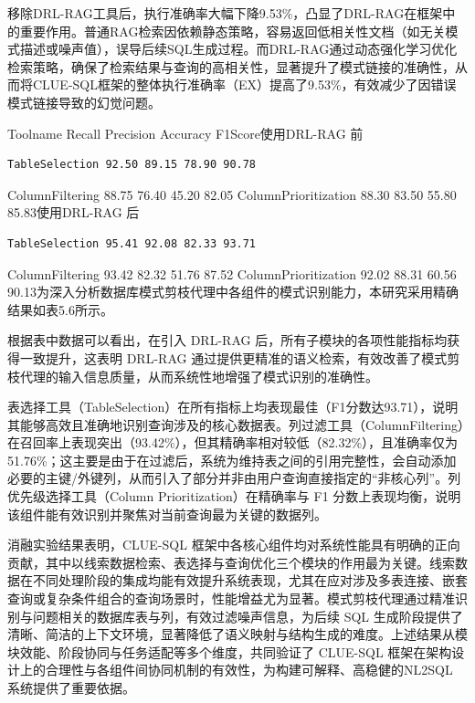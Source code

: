 \documentclass[12pt,a4paper,openright,UTF8]{ctexbook}
\begin{document}
移除DRL-RAG工具后，执行准确率大幅下降9.53\%，凸显了DRL-RAG在框架中的重要作用。普通RAG检索因依赖静态策略，容易返回低相关性文档（如无关模式描述或噪声值），误导后续SQL生成过程。而DRL-RAG通过动态强化学习优化检索策略，确保了检索结果与查询的高相关性，显著提升了模式链接的准确性，从而将CLUE-SQL框架的整体执行准确率（EX）提高了9.53\%，有效减少了因错误模式链接导致的幻觉问题。

\begin{table}[htbp]
\centering
\caption{表5.6数据库模式剪枝代理在使用工具后评估正确SQL表/列中模式项的性能指标}
\end{table}

Toolname Recall Precision Accuracy F1Score使用DRL-RAG 前

\begin{lstlisting}
TableSelection 92.50 89.15 78.90 90.78
\end{lstlisting}

ColumnFiltering 88.75 76.40 45.20 82.05 ColumnPrioritization 88.30 83.50 55.80 85.83使用DRL-RAG 后

\begin{lstlisting}
TableSelection 95.41 92.08 82.33 93.71
\end{lstlisting}

ColumnFiltering 93.42 82.32 51.76 87.52 ColumnPrioritization 92.02 88.31 60.56 90.13为深入分析数据库模式剪枝代理中各组件的模式识别能力，本研究采用精确结果如表5.6所示。


根据表中数据可以看出，在引入 DRL-RAG 后，所有子模块的各项性能指标均获得一致提升，这表明 DRL-RAG 通过提供更精准的语义检索，有效改善了模式剪枝代理的输入信息质量，从而系统性地增强了模式识别的准确性。


表选择工具（TableSelection）在所有指标上均表现最佳（F1分数达93.71），说明其能够高效且准确地识别查询涉及的核心数据表。列过滤工具（ColumnFiltering）在召回率上表现突出（93.42\%），但其精确率相对较低（82.32\%），且准确率仅为51.76\%；这主要是由于在过滤后，系统为维持表之间的引用完整性，会自动添加必要的主键/外键列，从而引入了部分并非由用户查询直接指定的“非核心列”。列优先级选择工具（Column Prioritization）在精确率与 F1 分数上表现均衡，说明该组件能有效识别并聚焦对当前查询最为关键的数据列。


消融实验结果表明，CLUE-SQL 框架中各核心组件均对系统性能具有明确的正向贡献，其中以线索数据检索、表选择与查询优化三个模块的作用最为关键。线索数据在不同处理阶段的集成均能有效提升系统表现，尤其在应对涉及多表连接、嵌套查询或复杂条件组合的查询场景时，性能增益尤为显著。模式剪枝代理通过精准识别与问题相关的数据库表与列，有效过滤噪声信息，为后续 SQL 生成阶段提供了清晰、简洁的上下文环境，显著降低了语义映射与结构生成的难度。上述结果从模块效能、阶段协同与任务适配等多个维度，共同验证了 CLUE-SQL 框架在架构设计上的合理性与各组件间协同机制的有效性，为构建可解释、高稳健的NL2SQL 系统提供了重要依据。
\end{document}
